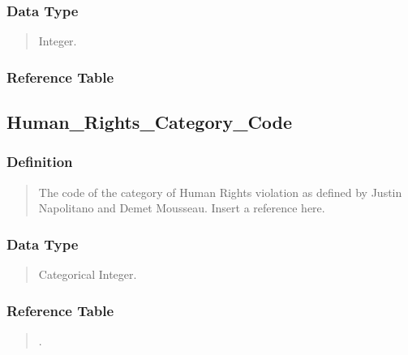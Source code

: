 \documentclass[letterpaper,10pt,english]{sphinxmanual}
\begin{document}
\subsubsection{Data Type}
\label{\detokenize{schema_tables:id65}}\begin{quote}

\sphinxAtStartPar
Integer.
\end{quote}


\subsubsection{Reference Table}
\label{\detokenize{schema_tables:id66}}\begin{quote}

\sphinxAtStartPar
{\hyperref[\detokenize{schema_tables:overview-table}]{}}
\end{quote}


\subsection{Human\_Rights\_Category\_Code}
\label{\detokenize{schema_tables:human-rights-category-code}}

\subsubsection{Definition}
\label{\detokenize{schema_tables:id67}}\begin{quote}

\sphinxAtStartPar
The code of the category of Human Rights violation as defined by Justin Napolitano and Demet Mousseau. Insert a reference here.
\end{quote}


\subsubsection{Data Type}
\label{\detokenize{schema_tables:id68}}\begin{quote}

\sphinxAtStartPar
Categorical Integer.
\end{quote}


\subsubsection{Reference Table}
\label{\detokenize{schema_tables:id69}}\begin{quote}

\sphinxAtStartPar
{\hyperref[\detokenize{schema_tables:human-rights-category-table}]{}}.
\end{quote}
\end{document}

